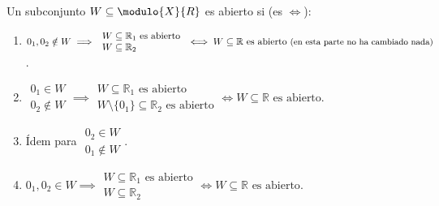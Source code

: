 \begin{ejem}
Un subconjunto $W \subseteq \modulo{X}{R}$ es abierto si (es $\iff$):

\begin{enumerate}
    \item $0_1, 0_2 \notin W \implies \begin{array}{l} W \subseteq \mathbb{R}_1 \text{ es abierto} \\ W \subseteq \mathbb{R}_2 \end{array} \iff W \subseteq \mathbb{R} \text{ es abierto } \text{\small(en esta parte no ha cambiado nada)}$.

    \item $\begin{array}{l} 0_1 \in W \\ 0_2 \notin W \end{array} \implies \begin{array}{l} W \subseteq \mathbb{R}_1 \text{ es abierto} \\ W \setminus \{0_1\} \subseteq \mathbb{R}_2 \text{ es abierto} \end{array} \iff W \subseteq \mathbb{R} \text{ es abierto}$.

    \item Ídem para $\begin{array}{l} 0_2 \in W \\ 0_1 \notin W \end{array}$.

    \item $0_1, 0_2 \in W \implies \begin{array}{l} W \subseteq \mathbb{R}_1 \text{ es abierto} \\ W \subseteq \mathbb{R}_2 \end{array} \iff W \subseteq \mathbb{R} \text{ es abierto}$.
\end{enumerate}
\end{ejem}
